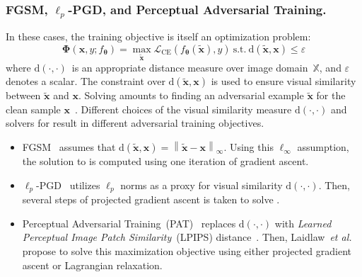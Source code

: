 \documentclass[runningheads]{llncs}
\newcommand{\norm}[1]{\left\lVert#1\right\rVert}
\newcommand{\etal}{\textit{et al.}}
\begin{document}
\subsubsection{FGSM, $\ell_p$-PGD, and Perceptual Adversarial Training.}
In these cases, the training objective is itself an optimization problem:
\begin{equation}\label{eq:at_functional}
\boldsymbol{\Phi} \left(\boldsymbol{x}, y; f_{\boldsymbol{\theta}}\right) = \max_{\tilde{\boldsymbol{x}}} \mathcal{L}_{\mathrm{CE}}\left(f_{\boldsymbol{\theta}}(\tilde{\boldsymbol{x}}), y\right)~ \text{s.t.}~\mathrm{d}\left({\tilde{\boldsymbol{x}}, \boldsymbol{x}}\right)\leq \varepsilon
\end{equation}
where $\mathrm{d}(\cdot, \cdot)$~is an appropriate distance measure over image domain~$\mathbb{X}$, and $\varepsilon$ denotes a scalar.
The constraint over $\mathrm{d}({\tilde{\boldsymbol{x}}, \boldsymbol{x}})$ is used to ensure visual similarity between $\tilde{\boldsymbol{x}}$ and $\boldsymbol{x}$.
Solving  amounts to finding an adversarial example $\tilde{\boldsymbol{x}}$ for the clean sample $\boldsymbol{x}$~\cite{madry2018towards}.
Different choices of the visual similarity measure $\mathrm{d}(\cdot, \cdot)$ and solvers for  result in different adversarial training objectives.
\begin{itemize}
	\item FGSM~\cite{goodfellow2014explaining} assumes that ${\mathrm{d}({\tilde{\boldsymbol{x}}, \boldsymbol{x}}) = \norm{{\tilde{\boldsymbol{x}}-\boldsymbol{x}}}_{\infty}}$.
	Using this $\ell_\infty$ assumption, the solution to  is computed using one iteration of gradient ascent.
	\item $\ell_p$-PGD~\cite{madry2018towards} utilizes $\ell_p$ norms as a proxy for visual similarity $\mathrm{d}(\cdot, \cdot)$. Then, several steps of projected gradient ascent is taken to solve .
	\item Perceptual Adversarial Training~(PAT)~\cite{laidlaw2021pat} replaces  $\mathrm{d}(\cdot, \cdot)$ with \textit{Learned Perceptual Image Patch Similarity}~(LPIPS) distance~\cite{zhang2018lpips}.
	Then, Laidlaw~\etal~\cite{laidlaw2021pat} propose to solve this maximization objective using either projected gradient ascent or Lagrangian relaxation.
\end{itemize}
\end{document}
